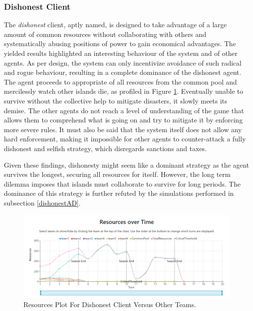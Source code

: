 \subsubsection{Dishonest Client}
The \emph{dishonest} client, aptly named, is designed to take advantage of a large amount of common resources without collaborating with others and systematically abusing positions of power to gain economical advantages. The yielded results highlighted an interesting behaviour of the system and of other agents. As per design, the system can only incentivize avoidance of such radical and rogue behaviour, resulting in a complete dominance of the dishonest agent. The agent proceeds to appropriate of all resources from the common pool and mercilessly watch other islands die, as profiled in Figure \ref{fig:ResourcesDO}. Eventually unable to survive without the collective help to mitigate disasters, it slowly meets its demise. The other agents do not reach a level of understanding of the game that allows them to comprehend what is going on and try to mitigate it by enforcing more severe rules. It must also be said that the system itself does not allow any hard enforcement, making it impossible for other agents to counter-attack a fully dishonest and selfish strategy, which disregards sanctions and taxes. 

Given these findings, dishonesty might seem like a dominant strategy as the agent survives the longest, securing all resources for itself. However, the long term dilemma imposes that islands must collaborate to survive for long periods. The dominance of this strategy is further refuted by the simulations performed in subsection \ref{dishonestAD}.

\begin{figure}[H]
\centering
\includegraphics[scale=0.4]{12_team4_agentdesign/images/ResourcesDO.png}
\caption{Resources Plot For Dishonest Client Versus Other Teams.}
\label{fig:ResourcesDO}
\end{figure}

